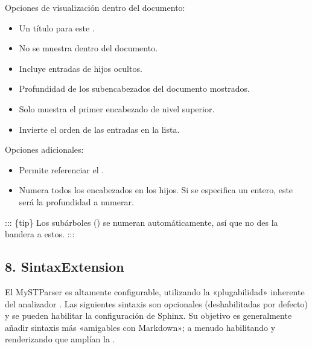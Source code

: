 \documentclass[a4paper,10pt,spanish]{sphinxmanual}
\begin{document}
\sphinxAtStartPar
Opciones de visualización dentro del documento:
\begin{itemize}
\item {} 
\sphinxAtStartPar
{} Un título para este .

\item {} 
\sphinxAtStartPar
{} No se muestra dentro del documento.

\item {} 
\sphinxAtStartPar
{} Incluye entradas  de hijos ocultos.

\item {} 
\sphinxAtStartPar
{} Profundidad de los sub\sphinxhyphen{}encabezados del documento mostrados.

\item {} 
\sphinxAtStartPar
{} Solo muestra el primer encabezado de nivel superior.

\item {} 
\sphinxAtStartPar
{} Invierte el orden de las entradas en la lista.

\end{itemize}

\sphinxAtStartPar
Opciones adicionales:
\begin{itemize}
\item {} 
\sphinxAtStartPar
{} Permite referenciar el .

\item {} 
\sphinxAtStartPar
{} Numera todos los encabezados en los hijos. Si se especifica un entero, este será la profundidad a numerar.

\end{itemize}

\sphinxAtStartPar
::: \{tip\}
Los sub\sphinxhyphen{}árboles () se numeran automáticamente, así que no des la bandera  a estos.
:::


\subsection{8. Sintax\sphinxhyphen{}Extension}
\label{\detokenize{configuracion_inicial/013.guia_de_myst_parser:sintax-extension}}
\sphinxAtStartPar
El MyST\sphinxhyphen{}Parser es altamente configurable, utilizando la «plugabilidad» inherente del analizador .
Las siguientes sintaxis son opcionales (deshabilitadas por defecto) y se pueden habilitar  la configuración  de Sphinx.
Su objetivo es generalmente añadir sintaxis más «amigables con Markdown»; a menudo habilitando y renderizando  que amplían la .
\end{document}

